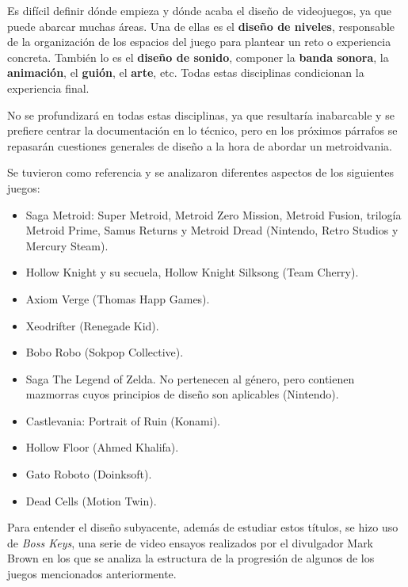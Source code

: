 Es difícil definir dónde empieza y dónde acaba el diseño de videojuegos, ya que puede abarcar muchas áreas. Una de ellas es el \textbf{diseño de niveles}, responsable de la organización de los espacios del juego para plantear un reto o experiencia concreta. También lo es el \textbf{diseño de sonido}, componer la \textbf{banda sonora}, la \textbf{animación}, el \textbf{guión}, el \textbf{arte}, etc. Todas estas disciplinas condicionan la experiencia final. 

No se profundizará en todas estas disciplinas, ya que resultaría inabarcable y se prefiere centrar la documentación en lo técnico, pero en los próximos párrafos se repasarán cuestiones generales de diseño a la hora de abordar un metroidvania.

Se tuvieron como referencia y se analizaron diferentes aspectos de los siguientes juegos:

\begin{itemize}
    \item Saga Metroid: Super Metroid, Metroid Zero Mission, Metroid Fusion, trilogía Metroid Prime, Samus Returns y Metroid Dread (Nintendo, Retro Studios y Mercury Steam).
    \item Hollow Knight y su secuela, Hollow Knight Silksong (Team Cherry).
    \item Axiom Verge (Thomas Happ Games).
    \item Xeodrifter (Renegade Kid).
    \item Bobo Robo (Sokpop Collective).
    \item Saga The Legend of Zelda. No pertenecen al género, pero contienen mazmorras cuyos principios de diseño son aplicables (Nintendo).
    \item Castlevania: Portrait of Ruin (Konami).
    \item Hollow Floor (Ahmed Khalifa).
    \item Gato Roboto (Doinksoft).
    \item Dead Cells (Motion Twin).
\end{itemize}

Para entender el diseño subyacente, además de estudiar estos títulos, se hizo uso de \textit{Boss Keys}\cite{boss-keys}, una serie de video ensayos realizados por el divulgador Mark Brown en los que se analiza la estructura de la progresión de algunos de los juegos mencionados anteriormente.

